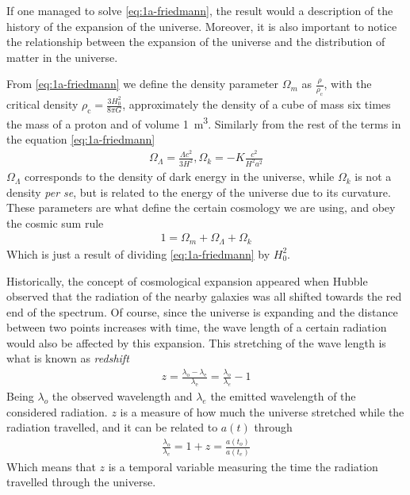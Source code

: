 If one managed to solve \eqref{eq:1a-friedmann}, the result would a description of the history of the expansion of the universe. Moreover, it is also important to notice the relationship between the expansion of the universe and the distribution of matter in the universe.

From \eqref{eq:1a-friedmann} we define the density parameter $\Omega_m$ as $\frac{\rho}{\rho_{\text{c}}}$, with the critical density $\rho_{\text{c}} = \frac{3H_0^2}{8\pi G}$, approximately the density of a cube of mass six times the mass of a proton and of volume \SI{1}{m^3}. Similarly from the rest of the terms in the equation \eqref{eq:1a-friedmann}
\begin{align}
 \Omega_\Lambda = \frac{\Lambda c^2}{3H^2}, \Omega_k = -K\frac{c^2}{H^2a^2} 
\end{align}
$\Omega_\Lambda$ corresponds to the density of dark energy in the universe, while $\Omega_k$ is not a density \textit{per se}, but is related to the energy of the universe due to its curvature.
These parameters are what define the certain cosmology we are using, and obey the cosmic sum rule 
\begin{align}
	1 = \Omega_m + \Omega_\Lambda + \Omega_k
\end{align}
Which is just a result of dividing \eqref{eq:1a-friedmann} by  $H_0^2$.

Historically, the concept of cosmological expansion appeared when Hubble observed that the radiation of the nearby galaxies was all shifted towards the red end of the spectrum. Of course, since the universe is expanding and the distance between two points increases with time, the wave length of a certain radiation would also be affected by this expansion. This stretching of the wave length is what is known as \textit{redshift} 
\begin{align}
	z = \frac{\lambda_{\text{o}} - \lambda_{\text{e}}}{\lambda_{\text{e}}} = \frac{\lambda_o}{\lambda_e} - 1
	\label{eq:redshift}
\end{align}
Being $\lambda_o$ the observed wavelength and $\lambda_e$ the emitted wavelength of the considered radiation. $z$ is a measure of how much the universe stretched while the radiation travelled, and it can be related to $a(t)$ through 
\begin{align}
	\frac{\lambda_o}{\lambda_e} = 1+z = \frac{a(t_o)}{a(t_e)}
\end{align}
Which means that $z$ is a temporal variable measuring the time the radiation travelled through the universe.

